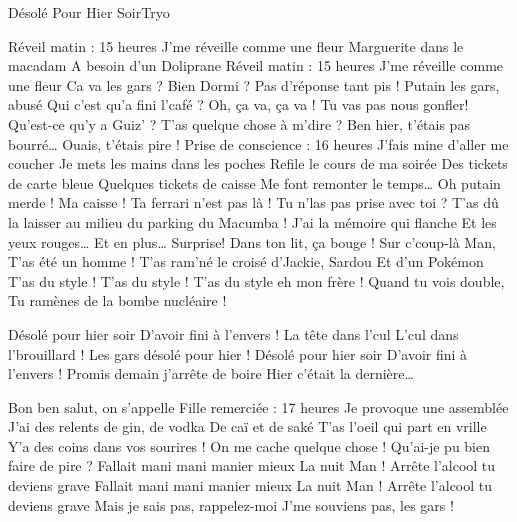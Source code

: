 \documentclass[a4paper,11pt,french]{article}
\begin{document}
\begin{Song}{Désolé Pour Hier Soir}{Tryo}
\begin{multicols}{2}
\begin{Verse}
Réveil matin : 15 heures
J'me réveille comme une fleur
Marguerite dans le macadam
A besoin d'un Doliprane
Réveil matin : 15 heures
J'me réveille comme une fleur
Ca va les gars ? Bien Dormi ?
Pas d'réponse tant pis !
Putain les gars, abusé
Qui c'est qu'a fini l'café ?
Oh, ça va, ça va !
Tu vas pas nous gonfler!
Qu'est-ce qu'y a Guiz' ?
T'as quelque chose à m'dire ?
Ben hier, t'étais pas bourré\dots
{}
Ouais, t'étais pire !
Prise de conscience : 16 heures
J'fais mine d'aller me coucher
Je mets les mains dans les poches
Refile le cours de ma soirée
Des tickets de carte bleue
Quelques tickets de caisse
Me font remonter le temps\dots
Oh putain merde ! Ma caisse !
Ta ferrari n'est pas là !
Tu n'las pas prise avec toi ?
T'as dû la laisser au milieu 
du parking du Macumba !
J'ai la mémoire qui flanche
Et les yeux rouges\dots
{} Et en plus\dots
{} Surprise!
 Dans ton lit, ça bouge !
Sur c'coup-là Man,
T'as été un homme !
T'as ram'né le croisé d'Jackie, Sardou
Et d'un Pokémon
T'as du style ! T'as du style !
T'as du style eh mon frère !
Quand tu vois double,
Tu ramènes de la bombe nucléaire !
\end{Verse}
\begin{Chorus}
Désolé pour hier soir
D'avoir fini à l'envers !
La tête dans l'cul
L'cul dans l'brouillard !
Les gars désolé pour hier !
Désolé pour hier soir
D'avoir fini à l'envers !
Promis demain j'arrête de boire
Hier c'était la dernière\dots
\end{Chorus}
\begin{Verse}
Bon ben salut, on s'appelle
Fille remerciée : 17 heures
Je provoque une assemblée
J'ai des relents de gin, de vodka
De caï et de saké
T'as l'oeil qui part en vrille
Y'a des coins dans vos sourires !
On me cache quelque chose !
Qu'ai-je pu bien faire de pire ?
Fallait mani mani manier mieux
La nuit Man !
Arrête l'alcool tu deviens grave
Fallait mani mani manier mieux
La nuit Man !
Arrête l'alcool tu deviens grave
Mais je sais pas, rappelez-moi
J'me souviens pas, les gars !

\end{Verse}
\end{multicols}
\end{Song}
\end{document}
